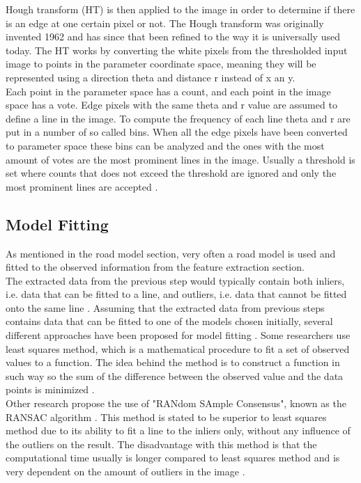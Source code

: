 Hough transform (HT) is then applied to the image in order to determine if there is an edge at one certain pixel or not. The Hough transform was originally invented 1962 and has since that been refined to the way it is universally used today. The HT works by converting the white pixels from the thresholded input image to points in the parameter coordinate space, meaning they will be represented using a direction theta and distance r instead of x an y.\\

Each point in the parameter space has a count, and each point in the image space has a vote. Edge pixels with the same theta and r value are assumed to define a line in the image. To compute the frequency of each line theta and r are put in a number of so called bins.  When all the edge pixels have been converted to parameter space these bins can be analyzed and the ones with the most amount of votes are the most prominent lines in the image. Usually a threshold is set where counts that does not exceed the threshold are ignored and only the most prominent lines are accepted \cite{davies}.


\subsection{Model Fitting}
As mentioned in the road model section, very often a road model is used and fitted to the observed information from the feature extraction section.\\

The extracted data from the previous step would typically contain both inliers, i.e. data that can be fitted to a line, and outliers, i.e. data that cannot be fitted onto the same line \cite{raguram2008comparative}. Assuming that the extracted data from previous steps contains data that can be fitted to one of the models chosen initially, several different approaches have been proposed for model fitting \cite{BarHillel2014}. Some researchers use least squares method, which is a mathematical procedure to fit a set of observed values to a function. The idea behind the method is to construct a function in such way so the sum of the difference between the observed value and the data points is minimized \cite{LS}.\\

Other research propose the use of "RANdom SAmple Consensus", known as the RANSAC algorithm \cite{huang2009finding}\cite{aly2008real} \cite{li2013lane}. This method is stated to be superior to least squares method due to its ability to fit a line to the inliers only, without any influence of the outliers on the result. The disadvantage with this method is that the computational time usually is longer compared to least squares method and is very dependent on the amount of outliers in the image \cite{RANSAC}.


